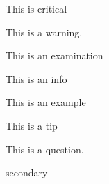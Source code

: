 \documentclass{liyua}
\begin{document}
\begin{critical}
	This is critical
\end{critical}
\begin{warning}
	This is a warning.
\end{warning}
\begin{examination}
	This is an examination
\end{examination}
\begin{info}
	This is an info
\end{info}
\begin{example}
	This is an example
\end{example}
\begin{tip}
	This is a tip
\end{tip}
\begin{question}
	This is a question.
\end{question}
\textcolor{secondary}{secondary}
\end{document}
